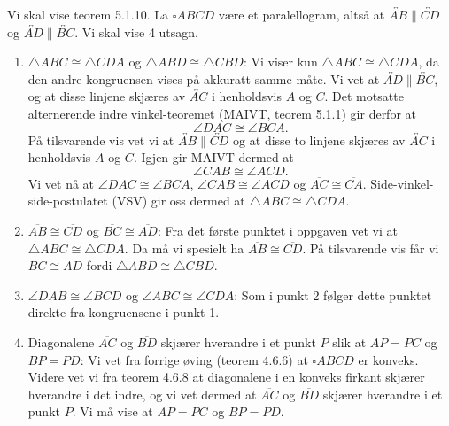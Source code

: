 \begin{oppgave}[5.1.2]
    Vi skal vise teorem 5.1.10. 
    La $\square ABCD$ være et paralellogram, altså at $\overleftrightarrow{AB}\parallel\overleftrightarrow{CD}$ og $\overleftrightarrow{AD}\parallel\overleftrightarrow{BC}$. 
    Vi skal vise 4 utsagn. 
    \begin{enumerate}
        \item $\triangle ABC\cong \triangle CDA$ og $\triangle ABD\cong \triangle CBD$: 
        Vi viser kun $\triangle ABC\cong \triangle CDA$, da den andre kongruensen vises på akkuratt samme måte. 
        Vi vet at $\overleftrightarrow{AD}\parallel\overleftrightarrow{BC}$, og at disse linjene skjæres av $\overleftrightarrow{AC}$ i henholdsvis $A$ og $C$. 
        Det motsatte alternerende indre vinkel-teoremet (MAIVT, teorem 5.1.1) gir derfor at 
        $$\angle DAC\cong \angle BCA.$$
        På tilsvarende vis vet vi at $\overleftrightarrow{AB}\parallel\overleftrightarrow{CD}$ og at disse to linjene skjæres av $\overleftrightarrow{AC}$ i henholdsvis $A$ og $C$. 
        Igjen gir MAIVT dermed at 
        $$\angle CAB\cong \angle ACD.$$
        Vi vet nå at $\angle DAC\cong \angle BCA$, $\angle CAB\cong\angle ACD$ og $\overline{AC}\cong\overline{CA}$. 
        Side-vinkel-side-postulatet (VSV) gir oss dermed at $\triangle ABC\cong \triangle CDA$. 

        \item $\overline{AB}\cong \overline{CD}$ og $\overline{BC}\cong\overline{AD}$: 
        Fra det første punktet i oppgaven vet vi at $\triangle ABC\cong \triangle CDA$. 
        Da må vi spesielt ha $\overline{AB}\cong \overline{CD}$. 
        På tilsvarende vis får vi $\overline{BC}\cong \overline{AD}$ fordi $\triangle ABD\cong \triangle CBD$. 

        \item $\angle DAB\cong\angle BCD$ og $\angle ABC\cong\angle CDA$: 
        Som i punkt 2 følger dette punktet direkte fra kongruensene i punkt 1. 

        \begin{figure}[H]
            \centering
             
        \end{figure}

        \item Diagonalene $\overline{AC}$ og $\overline{BD}$ skjærer hverandre i et punkt $P$ slik at $AP=PC$ og $BP=PD$: 
        Vi vet fra forrige øving (teorem 4.6.6) at $\square ABCD$ er konveks. 
        Videre vet vi fra teorem 4.6.8 at diagonalene i en konveks firkant skjærer hverandre i det indre, og vi vet dermed at $\overline{AC}$ og $\overline{BD}$ skjærer hverandre i et punkt $P$. 
        Vi må vise at $AP=PC$ og $BP=PD$. 


\end{enumerate}
\end{oppgave}
